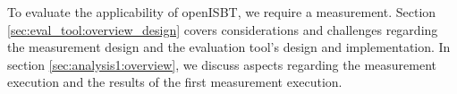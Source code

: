To evaluate the applicability of openISBT, we require a measurement. Section \ref{sec:eval_tool:overview_design} covers considerations and challenges regarding the measurement design and the evaluation tool's design and implementation. In section \ref{sec:analysis1:overview}, we discuss aspects regarding the measurement execution and the results of the first measurement execution.